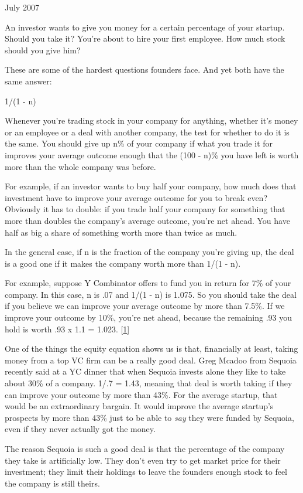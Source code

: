 July 2007

An investor wants to give you money for a certain percentage of your
startup. Should you take it? You're about to hire your first employee.
How much stock should you give him?

These are some of the hardest questions founders face. And yet both have
the same answer:

1/(1 - n)

Whenever you're trading stock in your company for anything, whether it's
money or an employee or a deal with another company, the test for
whether to do it is the same. You should give up n\% of your company if
what you trade it for improves your average outcome enough that the (100
- n)\% you have left is worth more than the whole company was before.

For example, if an investor wants to buy half your company, how much
does that investment have to improve your average outcome for you to
break even? Obviously it has to double: if you trade half your company
for something that more than doubles the company's average outcome,
you're net ahead. You have half as big a share of something worth more
than twice as much.

In the general case, if n is the fraction of the company you're giving
up, the deal is a good one if it makes the company worth more than 1/(1
- n).

For example, suppose Y Combinator offers to fund you in return for 7\%
of your company. In this case, n is .07 and 1/(1 - n) is 1.075. So you
should take the deal if you believe we can improve your average outcome
by more than 7.5\%. If we improve your outcome by 10\%, you're net
ahead, because the remaining .93 you hold is worth .93 x 1.1 = 1.023.
{[}\hyperref[f1n]{1}{]}

One of the things the equity equation shows us is that, financially at
least, taking money from a top VC firm can be a really good deal. Greg
Mcadoo from Sequoia recently said at a YC dinner that when Sequoia
invests alone they like to take about 30\% of a company. 1/.7 = 1.43,
meaning that deal is worth taking if they can improve your outcome by
more than 43\%. For the average startup, that would be an extraordinary
bargain. It would improve the average startup's prospects by more than
43\% just to be able to \emph{say} they were funded by Sequoia, even if
they never actually got the money.

The reason Sequoia is such a good deal is that the percentage of the
company they take is artificially low. They don't even try to get market
price for their investment; they limit their holdings to leave the
founders enough stock to feel the company is still theirs.

